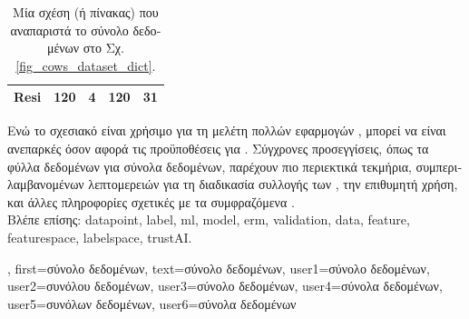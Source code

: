 {{\begin{table}[H]
\begin{tabular}{lcccc}
				Resi  & 120 & 4 & 120 & 31 \\
				\hline
			\end{tabular}
			{
			\caption{\foreignlanguage{greek}{Μία σχέση (ή πίνακας) που αναπαριστά το σύνολο δεδομένων στο Σχ.} \ref{fig_cows_dataset_dict}.}
			\label{tab:cowdata_dict}}
		\end{table}
 		\foreignlanguage{greek}{Ενώ το σχεσιακό}  \foreignlanguage{greek}{είναι χρήσιμο για τη μελέτη πολλών εφαρμογών} , 
		\foreignlanguage{greek}{μπορεί να είναι ανεπαρκές όσον αφορά τις προϋποθέσεις για} . \foreignlanguage{greek}{Σύγχρονες  
 		προσεγγίσεις, όπως τα φύλλα δεδομένων για σύνολα δεδομένων, παρέχουν πιο περιεκτικά τεκμήρια, συμπεριλαμβανομένων λεπτομερειών 
		για τη διαδικασία συλλογής των} , \foreignlanguage{greek}{την επιθυμητή χρήση, και άλλες πληροφορίες σχετικές με τα συμφραζόμενα} 
 		\cite{DatasheetData2021}.\\
 		\foreignlanguage{greek}{Βλέπε επίσης:} \gls{datapoint}, \gls{label}, \gls{ml}, \gls{model}, \gls{erm}, \gls{validation}, \gls{data}, \gls{feature}, \gls{featurespace}, 
		\gls{labelspace}, \gls{trustAI}.},
 	first={\foreignlanguage{greek}{σύνολο δεδομένων}},
 	text={\foreignlanguage{greek}{σύνολο δεδομένων}},
 	user1={\foreignlanguage{greek}{σύνολο δεδομένων}}, %
 	user2={\foreignlanguage{greek}{συνόλου δεδομένων}}, %
 	user3={\foreignlanguage{greek}{σύνολο δεδομένων}}, %
 	user4={\foreignlanguage{greek}{σύνολα δεδομένων}}, %
	user5={\foreignlanguage{greek}{συνόλων δεδομένων}}, %
 	user6={\foreignlanguage{greek}{σύνολα δεδομένων}} %
}

